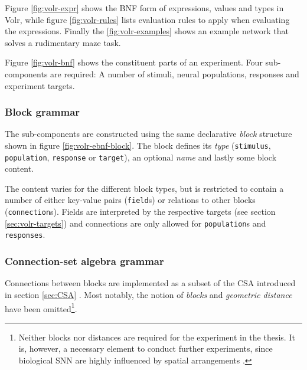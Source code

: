 \documentclass{report.tex}{subfiles}
\begin{document}
Figure \ref{fig:volr-expr} shows the BNF form of expressions, values and types
in Volr, while figure \ref{fig:volr-rules} lists evaluation rules to apply
when evaluating the expressions.
Finally the \ref{fig:volr-examples} shows an example network that solves
a rudimentary maze task.





\newpage\null\thispagestyle{empty}\newpage
\newpage\null\thispagestyle{empty}\newpage
\pagebreak
Figure \ref{fig:volr-bnf} shows the constituent parts of an experiment.
Four sub-com\-po\-nents are required:
  A number of stimuli, neural populations, responses and experiment targets.

\subsubsection{Block grammar} \label{sec:volr-block}
The sub-components are constructed using the same declarative \textit{block}
structure shown in figure \ref{fig:volr-ebnf-block}.
The block defines its \textit{type} (\texttt{stimulus}, \texttt{population},
\texttt{response} or \texttt{target}), an optional \textit{name} and lastly
some block content.

The content varies for the different block types, but is restricted to contain
a number of either key-value pairs (\texttt{field}s) or relations to other
blocks (\texttt{connection}s).
Fields are interpreted by the respective targets (see section
\ref{sec:volr-targets}) and connections are only allowed for
\texttt{population}s and \texttt{responses}.

\subsubsection{Connection-set algebra grammar} \label{sec:volr-csa}
Connections between blocks are implemented as a subset of the \gls{CSA}
introduced in section \ref{sec:CSA} \autocite{Djurfeldt2012}.
Most notably, the notion of \textit{blocks} and \textit{geometric distance} have
been omitted\footnote{Neither blocks nor distances are required for the
  experiment in the thesis. It is, however, a necessary element to conduct
  further experiments, since biological \gls{SNN} are highly influenced by
  spatial arrangements \autocite{dayan2001}.
}.
\end{document}
